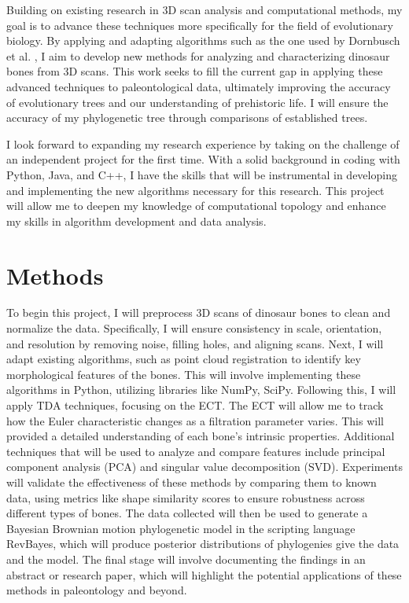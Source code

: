 \documentclass[12pt]{article}
\begin{document}
Building on existing research in 3D scan analysis and computational methods, my
goal is to advance these techniques more specifically for the field of
evolutionary biology. By applying and adapting algorithms such as the one used by
Dornbusch et al. \citep{dornbusch2007}, I aim to develop new methods for analyzing 
and characterizing dinosaur bones from 3D scans. This work seeks to fill the 
current gap in applying these advanced techniques to paleontological data, 
ultimately improving the accuracy of evolutionary trees and our understanding of 
prehistoric life. I will ensure the accuracy of my phylogenetic tree through
comparisons of established trees.

I look forward to expanding my research experience by taking on the challenge of
an independent project for the first time. With a solid background in
coding with Python, Java, and C++, I have the skills that will be instrumental 
in developing and implementing the new algorithms necessary for this research. 
This project will allow me to deepen my knowledge of computational topology and 
enhance my skills in algorithm development and data analysis. 

\section{Methods}
To begin this project, I will preprocess 3D scans of dinosaur bones to clean and
normalize the data. Specifically, I will ensure consistency in scale, orientation, 
and resolution by removing noise, filling holes, and aligning scans.  Next, I 
will adapt existing algorithms, such as point cloud registration to identify key 
morphological features of the bones. This will involve implementing these
algorithms in Python, utilizing libraries like NumPy, SciPy. Following this, 
I will apply TDA techniques, focusing on the ECT. The ECT will
allow me to track how the Euler characteristic changes as a filtration parameter
varies. This will provided a detailed understanding of each bone's intrinsic
properties. Additional techniques that will be used to analyze and compare
features include principal component analysis (PCA) and singular value 
decomposition (SVD). Experiments will validate the effectiveness of these methods 
by comparing them to known data, using metrics like shape similarity scores to 
ensure robustness across different types of bones.
The data collected will then be used to generate a Bayesian Brownian motion
phylogenetic model in the scripting language RevBayes, which will produce
posterior distributions of phylogenies give the data and the model. 
The final stage will involve documenting the findings in an abstract or research 
paper, which will highlight the potential applications of these methods in 
paleontology and beyond.
\end{document}
